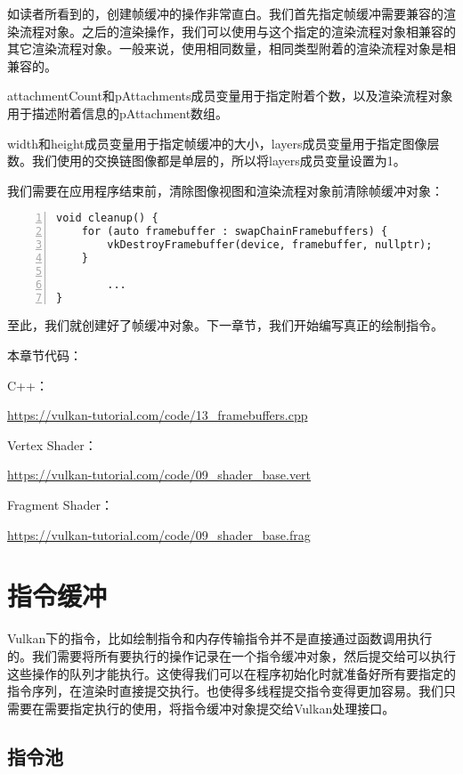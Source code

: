 \documentclass{ctexart}
\begin{document}
如读者所看到的，创建帧缓冲的操作非常直白。我们首先指定帧缓冲需要兼容的渲染流程对象。之后的渲染操作，我们可以使用与这个指定的渲染流程对象相兼容的其它渲染流程对象。一般来说，使用相同数量，相同类型附着的渲染流程对象是相兼容的。

attachmentCount和pAttachments成员变量用于指定附着个数，以及渲染流程对象用于描述附着信息的pAttachment数组。

width和height成员变量用于指定帧缓冲的大小，layers成员变量用于指定图像层数。我们使用的交换链图像都是单层的，所以将layers成员变量设置为1。

我们需要在应用程序结束前，清除图像视图和渲染流程对象前清除帧缓冲对象：

\begin{lstlisting}[language={[ANSI]C},keywordstyle=\color{blue!70},commentstyle=\color{red!50!green!50!blue!50},frame=shadowbox, rulesepcolor=\color{red!20!green!20!blue!20},basicstyle=\small,numbers=left, numberstyle=\tiny,breaklines=true]
void cleanup() {
	for (auto framebuffer : swapChainFramebuffers) {
		vkDestroyFramebuffer(device, framebuffer, nullptr);
	}

		...
}
\end{lstlisting}

至此，我们就创建好了帧缓冲对象。下一章节，我们开始编写真正的绘制指令。

本章节代码：

C++：

\url{https://vulkan-tutorial.com/code/13_framebuffers.cpp}

Vertex Shader：

\url{https://vulkan-tutorial.com/code/09_shader_base.vert}

Fragment Shader：

\url{https://vulkan-tutorial.com/code/09_shader_base.frag}

\newpage
\section{指令缓冲}

Vulkan下的指令，比如绘制指令和内存传输指令并不是直接通过函数调用执行的。我们需要将所有要执行的操作记录在一个指令缓冲对象，然后提交给可以执行这些操作的队列才能执行。这使得我们可以在程序初始化时就准备好所有要指定的指令序列，在渲染时直接提交执行。也使得多线程提交指令变得更加容易。我们只需要在需要指定执行的使用，将指令缓冲对象提交给Vulkan处理接口。

\subsection{指令池}
\end{document}
